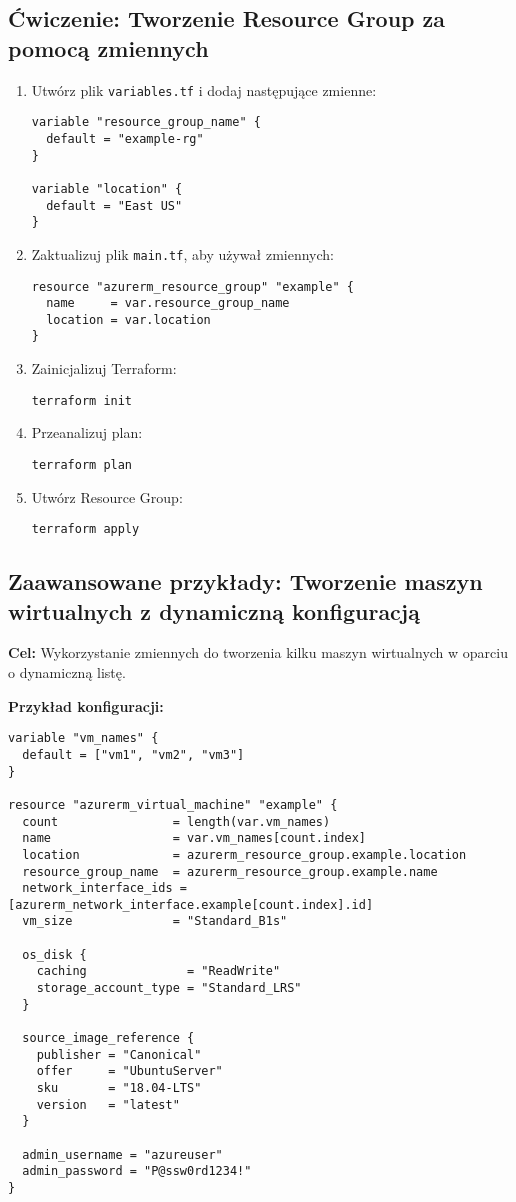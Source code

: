 \documentclass{article}
\begin{document}
\subsection{Ćwiczenie: Tworzenie Resource Group za pomocą zmiennych}
\begin{enumerate}
    \item Utwórz plik \texttt{variables.tf} i dodaj następujące zmienne:
    \begin{lstlisting}
variable "resource_group_name" {
  default = "example-rg"
}

variable "location" {
  default = "East US"
}
    \end{lstlisting}
    \item Zaktualizuj plik \texttt{main.tf}, aby używał zmiennych:
    \begin{lstlisting}
resource "azurerm_resource_group" "example" {
  name     = var.resource_group_name
  location = var.location
}
    \end{lstlisting}
    \item Zainicjalizuj Terraform:
    \begin{lstlisting}
terraform init
    \end{lstlisting}
    \item Przeanalizuj plan:
    \begin{lstlisting}
terraform plan
    \end{lstlisting}
    \item Utwórz Resource Group:
    \begin{lstlisting}
terraform apply
    \end{lstlisting}
\end{enumerate}

\subsection{Zaawansowane przykłady: Tworzenie maszyn wirtualnych z dynamiczną konfiguracją}
\textbf{Cel:} Wykorzystanie zmiennych do tworzenia kilku maszyn wirtualnych w oparciu o dynamiczną listę.

\textbf{Przykład konfiguracji:}
\begin{lstlisting}
variable "vm_names" {
  default = ["vm1", "vm2", "vm3"]
}

resource "azurerm_virtual_machine" "example" {
  count                = length(var.vm_names)
  name                 = var.vm_names[count.index]
  location             = azurerm_resource_group.example.location
  resource_group_name  = azurerm_resource_group.example.name
  network_interface_ids = [azurerm_network_interface.example[count.index].id]
  vm_size              = "Standard_B1s"

  os_disk {
    caching              = "ReadWrite"
    storage_account_type = "Standard_LRS"
  }

  source_image_reference {
    publisher = "Canonical"
    offer     = "UbuntuServer"
    sku       = "18.04-LTS"
    version   = "latest"
  }

  admin_username = "azureuser"
  admin_password = "P@ssw0rd1234!"
}
\end{lstlisting}
\end{document}
